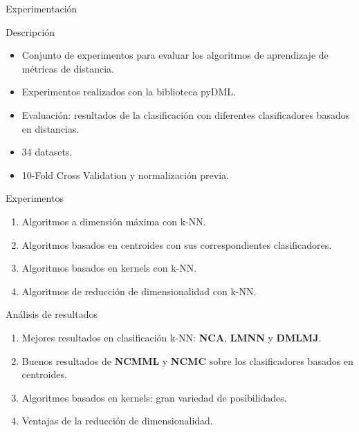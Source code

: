 \documentclass[10pt, compress]{beamer}
\begin{document}
\begin{frame}[shrink]{Experimentación}
  \begin{alertblock}{Descripción}
    \begin{itemize}
      \item Conjunto de experimentos para evaluar los algoritmos de aprendizaje de métricas de distancia.
      \item Experimentos realizados con la biblioteca pyDML.
      \item Evaluación: resultados de la clasificación con diferentes clasificadores basados en distancias.
      \item 34 datasets.
      \item 10-Fold Cross Validation y normalización previa.
    \end{itemize}
  \end{alertblock} 

  \begin{block}{Experimentos}
    \begin{enumerate}
      \item Algoritmos a dimensión máxima con k-NN.
      \item Algoritmos basados en centroides con sus correspondientes clasificadores.
      \item Algoritmos basados en kernels con k-NN.
      \item Algoritmos de reducción de dimensionalidad con k-NN.
    \end{enumerate}
  \end{block}

\end{frame}

    

\begin{frame}{Análisis de resultados}
  \begin{enumerate}
    \item Mejores resultados en clasificación k-NN: \textbf{NCA}, \textbf{LMNN} y \textbf{DMLMJ}.
    \item Buenos resultados de \textbf{NCMML} y \textbf{NCMC} sobre los clasificadores basados en centroides.
    \item Algoritmos basados en kernels: gran variedad de posibilidades.
    \item Ventajas de la reducción de dimensionalidad.
  \end{enumerate}
\end{frame}
\end{document}

